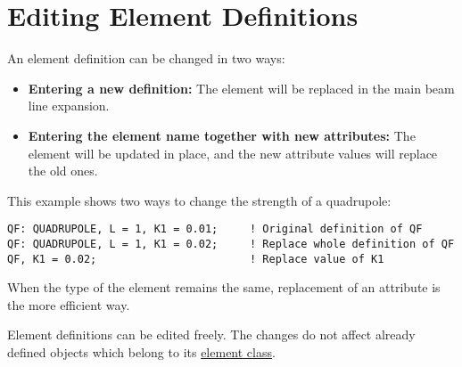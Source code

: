 
\section{Editing Element Definitions}  

An element definition can be changed in two ways: 
\begin{itemize}
   \item \textbf{Entering a new definition:} The element will be
     replaced in the main beam line expansion.  
   \item \textbf{Entering the element name together with new
     attributes:} The element will be updated in place, and the new
     attribute values will replace the old ones.  
\end{itemize} 

This example shows two ways to change the strength of a quadrupole: 
\begin{verbatim}
QF: QUADRUPOLE, L = 1, K1 = 0.01;     ! Original definition of QF
QF: QUADRUPOLE, L = 1, K1 = 0.02;     ! Replace whole definition of QF
QF, K1 = 0.02;                        ! Replace value of K1
\end{verbatim} 

When the type of the element remains the same, replacement of an
attribute is the more efficient way.  

Element definitions can be edited freely. The changes do not affect
already defined objects which belong to its
\href{elm_class.html}{element class}.  


